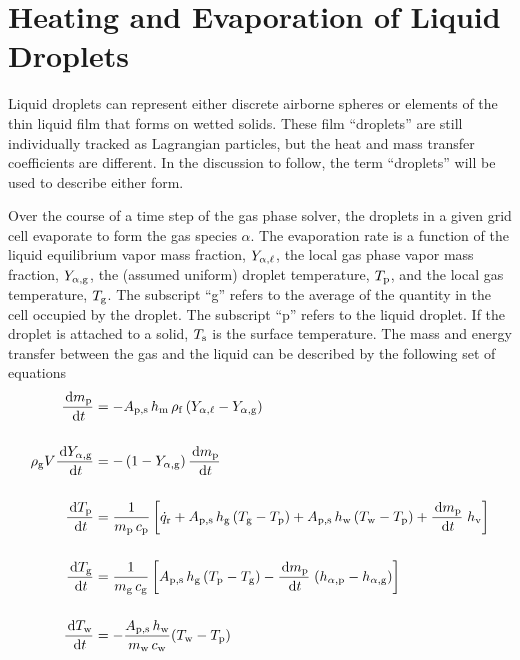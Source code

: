 \section{Heating and Evaporation of Liquid Droplets}

Liquid droplets can represent either discrete airborne spheres or elements of the thin liquid film that forms on wetted solids. These film ``droplets'' are still individually tracked as Lagrangian particles, but the heat and mass transfer coefficients are different. In the discussion to follow, the term ``droplets'' will be used to describe either form.

Over the course of a time step of the gas phase solver, the droplets in a given grid cell evaporate to form the gas species $\alpha$. The evaporation rate is a function of the liquid equilibrium vapor mass fraction, $Y_{\rm \alpha,\ell}$, the local gas phase vapor mass fraction, $Y_{\rm \alpha,g}$, the (assumed uniform) droplet temperature, $T_{\rm p}$, and the local gas temperature, $T_{\rm g}$. The subscript ``g'' refers to the average of the quantity in the cell occupied by the droplet. The subscript ``p'' refers to the liquid droplet. If the droplet is attached to a solid, $T_{\rm s}$ is the surface temperature. The mass and energy transfer between the gas and the liquid can be described by the following set of equations~\cite{Cheremisinoff:1}
\begin{align}
\frac{\,\mathrm{d} m_{\rm p}}{\,\mathrm{d} t} & = - A_{\rm p,s} \, h_{\rm m} \, \rho_{\rm f} \, (Y_{\alpha,\ell} - Y_{\rm \alpha, g}) \label{droplet_mass} \\[0.2in]
\rho_{\rm g} V \frac{\,\mathrm{d} Y_{\rm \alpha, g}}{\,\mathrm{d} t} & = -\left(1-Y_{\rm \alpha, g}\right)\frac{\,\mathrm{d} m_{\rm p}}{\,\mathrm{d} t}  \label{droplet_gas_fraction} \\[0.2in]
\frac{\,\mathrm{d} T_{\rm p}}{\,\mathrm{d} t} & = \frac{1}{m_{\rm p} \, c_{\rm p}}  \left[ \dot{q}_{\rm r} + A_{\rm p,s} \, h_{\rm g}  \, (T_{\rm g}-T_{\rm p}) + A_{\rm p,s} \, h_{\rm w}  \, (T_{\rm w}-T_{\rm p}) + \frac{\,\mathrm{d} m_{\rm p}}{\,\mathrm{d} t} \; h_{\rm v} \right]  \label{droplet_temp}  \\[0.2in]
\frac{\,\mathrm{d} T_{\rm g}}{\,\mathrm{d} t} & = \frac{1}{m_{\rm g} \, c_{\rm g}}  \left[A_{\rm p,s} \, h_{\rm g}  \, (T_{\rm p}-T_{\rm g}) - \frac{\,\mathrm{d} m_{\rm p}}{\,\mathrm{d} t} \; (h_{\rm \alpha,p}-h_{\rm \alpha,g}) \right]  \label{droplet_gas_temp}   \\[0.2in]
\frac{\,\mathrm{d} T_{\rm w}}{\,\mathrm{d} t} & = -\frac{A_{\rm p,s} \, h_{\rm w}}{m_{\rm w} \, c_{\rm w}} (T_{\rm w}-T_{\rm p})  \label{droplet_solid_temp}
\end{align}
